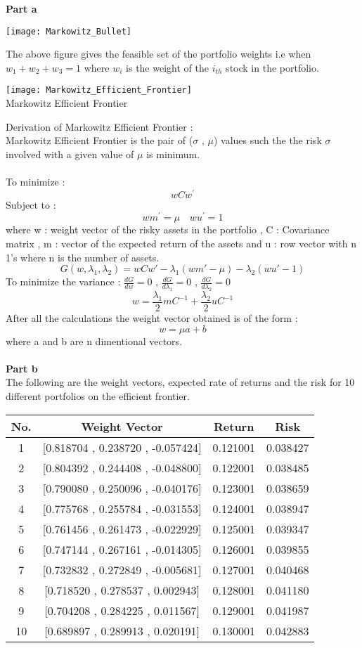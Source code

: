 \documentclass{article}
\begin{document}
\textbf{Part a}

\begin{center}
\texttt{[image: Markowitz\_Bullet]}
\end{center}
The above figure gives the feasible set of the portfolio weights i.e when $w_{1} + w_{2} + w_{3} = 1$ where $w_{i}$ is the weight of the $i_{th}$ stock in the portfolio.
\begin{center}
\texttt{[image: Markowitz\_Efficient\_Frontier]}\\
Markowitz Efficient Frontier
\end{center}
Derivation of Markowitz Efficient Frontier :\\
Markowitz Efficient Frontier is the pair of ($\sigma$ , $\mu$) values such the the risk $\sigma$ involved with a given value of $\mu$ is minimum.\\\\
To minimize :
$$w C w^{'}$$
Subject to :
$$w m^{'} = \mu \quad wu^{'} = 1$$
where w : weight vector of the risky assets in the portfolio , C : Covariance matrix , m : vector of the expected return of the assets and u : row vector with n 1's where n is the number of assets.
$$G(w,\lambda_{1},\lambda_{2}) = wCw' - \lambda_{1}(wm' - \mu) - \lambda_{2}(wu' - 1)$$
To minimize the variance : $\frac{dG}{dw} = 0$ , $\frac{dG}{d\lambda_{1}} = 0$ , $\frac{dG}{d\lambda_{2}} = 0$
$$w = \frac{\lambda_{1}}{2}mC^{-1} + \frac{\lambda_{2}}{2}uC^{-1}$$
After all the calculations the weight vector obtained is of the form :
$$w = \mu a + b$$
where a and b are n dimentional vectors.\\\\
\textbf{Part b}\\
The following are the weight vectors, expected rate of returns and the risk for 10 different portfolios on the efficient frontier.
\begin{center}
\begin{tabular}{ |c|c|c|c| } 
 \hline
 No. & Weight Vector & Return & Risk\\
 \hline
1 & [0.818704 , 0.238720 , -0.057424] & 0.121001 & 0.038427\\
2 & [0.804392 , 0.244408 , -0.048800] & 0.122001 & 0.038485\\
3 & [0.790080 , 0.250096 , -0.040176] & 0.123001 & 0.038659\\
4 & [0.775768 , 0.255784 , -0.031553] & 0.124001 & 0.038947\\
5 & [0.761456 , 0.261473 , -0.022929] & 0.125001 & 0.039347\\
6 & [0.747144 , 0.267161 , -0.014305] & 0.126001 & 0.039855\\
7 & [0.732832 , 0.272849 , -0.005681] & 0.127001 & 0.040468\\
8 & [0.718520 , 0.278537 ,  0.002943] & 0.128001 & 0.041180\\
9 & [0.704208 , 0.284225 ,  0.011567] & 0.129001 & 0.041987\\
10 & [0.689897 , 0.289913 , 0.020191] & 0.130001 & 0.042883\\
 \hline
\end{tabular}
\end{center}
\end{document}
